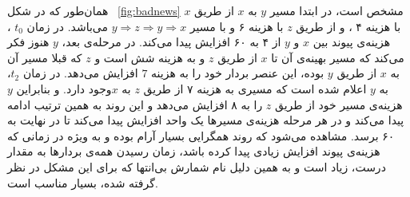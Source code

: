 همان‌طور که در شکل 
~\ref{fig:badnews}
مشخص است، در ابتدا مسیر $y$ به $x$ از طریق $x$ با هزینه ۴ ، و از طریق $z$‌ با هزینه ۶ و با مسیر $y\Rightarrow z\Rightarrow y\Rightarrow x$   می‌باشد. در زمان $t_{0}$ ، هزینه‌ی پیوند بین $x$ و $y$ از ۴ به ۶۰ افزایش پیدا می‌کند. در مرحله‌ی بعد، $y$ هنوز فکر می‌کند که مسیر بهینه‌ی آن تا $x$ از طریق $z$ و به هزینه شش است و  $z$ که قبلا مسیر آن به $x$ از طریق $y$ بوده، این عنصر بردار خود را به هزینه $7$ افزایش می‌دهد. در زمان $t_{2}$، به  $y$  اعلام شده است که مسیری به هزینه ۷ از طریق $z$ به  $x$وجود دارد. و بنابراین $y$ هزینه‌ی مسیر خود از طریق $z$ را به ۸ افزایش می‌دهد و این روند به همین ترتیب ادامه پیدا می‌کند و در هر مرحله هزینه‌ی مسیرها یک واحد افزایش پیدا می‌کند تا در نهایت به ۶۰ برسد. مشاهده می‌شود که روند همگرایی بسیار آرام بوده و به ویژه در زمانی که هزینه‌ی پیوند افزایش زیادی پیدا کرده باشد، زمان رسیدن همه‌ی بردارها به مقدار درست، زیاد است و به همین دلیل نام شمارش بی‌انتها که برای این مشکل در نظر گرفته شده، بسیار مناسب است. 
